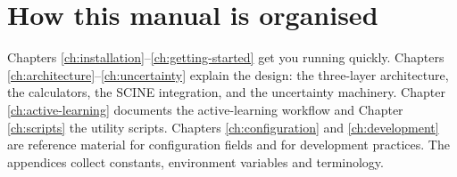\section{How this manual is organised}

Chapters \ref{ch:installation}--\ref{ch:getting-started} get you running
quickly.  Chapters \ref{ch:architecture}--\ref{ch:uncertainty} explain the
design: the three-layer architecture, the calculators, the SCINE
integration, and the uncertainty machinery.  Chapter
\ref{ch:active-learning} documents the active-learning workflow and
Chapter \ref{ch:scripts} the utility scripts.  Chapters
\ref{ch:configuration} and \ref{ch:development} are reference material for
configuration fields and for development practices.  The appendices collect
constants, environment variables and terminology.
